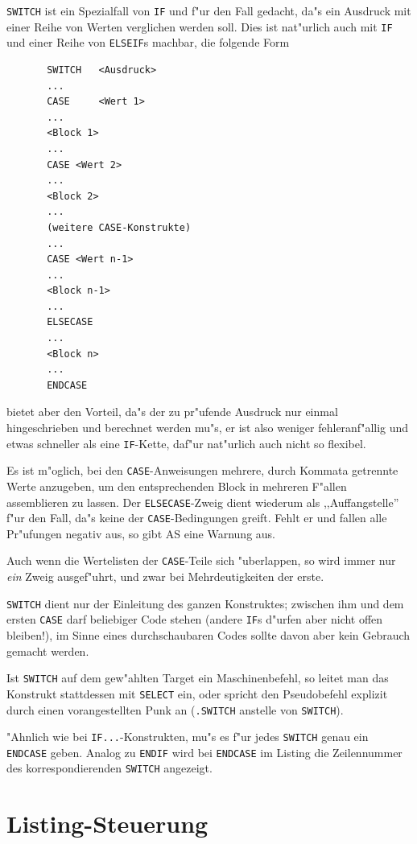 \documentclass[12pt,a4paper,twoside]{report}
\newcommand{\ii}[1]{{\it #1}}
\newcommand{\tty}[1]{{\tt #1}}
\newcommand{\asname}{AS}
\begin{document}
\tty{SWITCH} ist ein Spezialfall von \tty{IF} und f"ur den Fall gedacht, da"s ein
Ausdruck mit einer Reihe von Werten verglichen werden soll.  Dies ist
nat"urlich auch mit \tty{IF} und einer Reihe von \tty{ELSEIF}s machbar, die folgende
Form
\begin{verbatim}
       SWITCH   <Ausdruck>
       ...
       CASE     <Wert 1>
       ...
       <Block 1>
       ...
       CASE <Wert 2>
       ...
       <Block 2>
       ...
       (weitere CASE-Konstrukte)
       ...
       CASE <Wert n-1>
       ...
       <Block n-1>
       ...
       ELSECASE
       ...
       <Block n>
       ...
       ENDCASE
\end{verbatim}
bietet aber den Vorteil, da"s der zu pr"ufende Ausdruck nur einmal hingeschrieben
und berechnet werden mu"s, er ist also weniger fehleranf"allig und etwas
schneller als eine \tty{IF}-Kette, daf"ur nat"urlich auch nicht so flexibel.
\par
Es ist m"oglich, bei den \tty{CASE}-Anweisungen mehrere, durch Kommata getrennte
Werte anzugeben, um den entsprechenden Block in mehreren F"allen assemblieren
zu lassen.  Der \tty{ELSECASE}-Zweig dient wiederum als ,,Auffangstelle'' f"ur den
Fall, da"s keine der \tty{CASE}-Bedingungen greift.  Fehlt er und fallen alle
Pr"ufungen negativ aus, so gibt \asname{} eine Warnung aus.
\par
Auch wenn die Wertelisten der \tty{CASE}-Teile sich "uberlappen, so wird immer
nur \ii{ein} Zweig ausgef"uhrt, und zwar bei Mehrdeutigkeiten der erste.
\par
\tty{SWITCH} dient nur der Einleitung des ganzen Konstruktes; zwischen ihm und
dem ersten \tty{CASE} darf beliebiger Code stehen (andere \tty{IF}s d"urfen aber nicht
offen bleiben!), im Sinne eines durchschaubaren Codes sollte davon aber
kein Gebrauch gemacht werden.
\par
Ist \tty{SWITCH} auf dem gew"ahlten Target ein Maschinenbefehl,
so leitet man das Konstrukt stattdessen mit \tty{SELECT} ein, oder spricht
den Pseudobefehl explizit durch einen vorangestellten Punk an (\tty{.SWITCH}
anstelle von \tty{SWITCH}).
\par
"Ahnlich wie bei {\tt IF...}-Konstrukten, mu"s es f"ur jedes {\tt SWITCH}
genau ein {\tt ENDCASE} geben.  Analog zu {\tt ENDIF} wird bei {\tt ENDCASE}
im Listing die Zeilennummer des korrespondierenden {\tt SWITCH} angezeigt.


\section{Listing-Steuerung}
\end{document}
